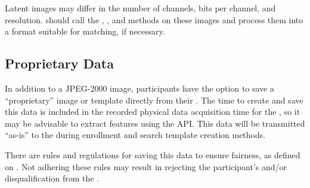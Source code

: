Latent images may differ in the number of channels, bits per channel, and
resolution. \Libs should call the , ,
and  methods on these images and process them into a
format suitable for matching, if necessary.

\subsection{Proprietary Data}
In addition to a JPEG-2000 image, participants have the option to save a
``proprietary'' image or template directly from their \scanner. The time to
create and save this data is included in the recorded physical data acquisition
time for the \scanner, so it may be advisable to extract features using the
API.  This data will be transmitted ``as-is'' to the \lib during enrollment and
search template creation methods.

There are rules and regulations for saving this data to ensure fairness, as
defined on \theprojectwebsite. Not adhering these rules may result in
rejecting the participant's \lib and/or disqualification from the \project. 

